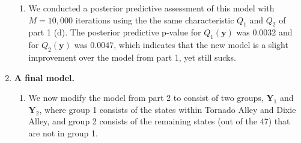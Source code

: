 \documentclass[12pt]{article}
\begin{document}
\begin{enumerate}
\begin{enumerate}
      \item We conducted a posterior predictive assessment of this model with $M = 10,000$ iterations 
        using the the same characteristic $Q_1$ and $Q_2$ of part 1 (d). The posterior predictive p-value for
        $Q_1(\bm{y})$ was $0.0032$ and for $Q_2(\bm{y})$ was $0.0047$, which indicates that the new model is a slight improvement over the model from
        part 1, yet still sucks.

    \end{enumerate}

  \item \textbf{A final model.}

    \begin{enumerate}
      \item We now modify the model from part 2 to consist of two groups, $\bm{Y}_1$ and $\bm{Y}_2$, where group 1 consists of the states
        within Tornado Alley and Dixie Alley, and group 2 consists of the remaining states (out of the 47) that are not in group 1.
    \end{enumerate}
\end{enumerate}
\end{document}
